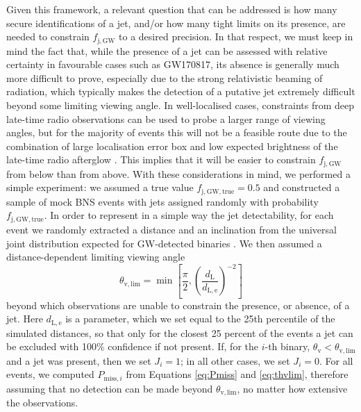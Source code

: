 \documentclass[]{aa}
\newcommand{\resp}[1]{#1}
\begin{document}
\begin{appendix}
Given this framework, a relevant question that can be addressed is how many secure identifications of a jet, and/or how many tight limits on its presence, are needed to constrain $f_\mathrm{j,GW}$ to a desired precision. In that respect, we must keep in mind the fact that, while the presence of a jet can be assessed with relative certainty in favourable cases such as GW170817, its absence is generally much more difficult to prove, especially due to the strong relativistic beaming of radiation, which typically makes the detection of a putative jet extremely difficult beyond some limiting viewing angle. In well-localised cases, constraints from deep late-time radio observations can be used to probe a larger range of viewing angles, but for the majority of events this will not be a feasible route due to the combination of large localisation error box and low expected brightness of the late-time radio afterglow \citep[e.g.][]{Hotokezaka2016,Dobie2021,Colombo2022}. This implies that it will be easier to constrain $f_\mathrm{j,GW}$ from below than from above. With these considerations in mind, we performed a simple experiment: we assumed a true value $f_\mathrm{j,GW,true}=0.5$ and constructed a sample of mock BNS events with jets assigned randomly with probability $f_\mathrm{j,GW,true}$. In order to represent in a simple way the jet detectability, for each event we randomly extracted a distance and an inclination from the universal joint distribution expected for GW-detected binaries \citep{Schutz2011}. We then assumed a distance-dependent limiting viewing angle 
\begin{equation}
\theta_\mathrm{v,lim}=\min\left[\frac{\pi}{2},\left(\frac{d_\mathrm{L}}{d_\mathrm{L,e}}\right)^{-2} \right]
\label{eq:thvlim}
\end{equation}
beyond which observations are unable to constrain the presence, or absence, of a jet. Here $d_\mathrm{L,e}$ is a parameter, which we set equal to the 25th percentile of the simulated distances, so that only for \resp{the closest} 25 percent of the events a jet can be excluded with 100\% confidence if not present. If, for the $i$-th binary, $\theta_\mathrm{v}<\theta_\mathrm{v,lim}$ and a jet was present, then we set $J_i=1$; in all other cases, we set $J_i=0$. For all events, we computed $P_{\mathrm{miss},i}$ from Equations \ref{eq:Pmiss} and \ref{eq:thvlim}, therefore assuming that no detection can be made beyond $\theta_\mathrm{v,lim}$, no matter how extensive the observations. 
%
\begin{figure}

\end{figure}
\end{appendix}
\end{document}
